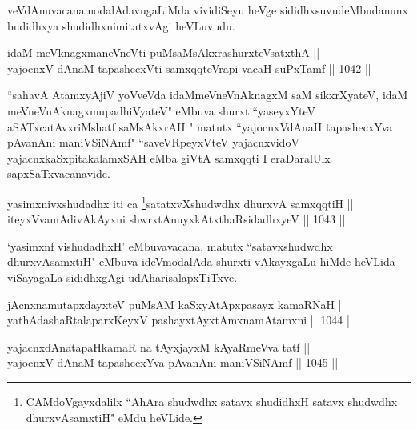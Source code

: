 \begin{artha}
veVdAnuvacanamodalAdavugaLiMda vividiSeyu heVge sididhxsuvudeMbudanunx budidhxya shudidhxnimitatxvAgi heVLuvudu.
\end{artha}


\begin{shl}
idaM meV\s knagxmaneVneVti puMsaMsAkxrashurxteVsatxthA || \\
yajocnxV dAnaM tapashecxVti samxqqteVrapi vacaH suPxTamf \hfill || 1042 || 
\end{shl}

\begin{artha}
``sahavA AtamxyAjiV yoVveVda idaMmeV\s neVnAknagxM saM sikxrXyateV, idaM meV\s neVnAknagxmupadhiVyateV" eMbuva shurxti\break ``yaseyxYteV aSATxcatAvxriMshatf saMsAkxrAH " matutx ``yajocnxVdAnaH tapashecxYva pAvanAni maniVSiNAmf" ``saveVRpeyxVteV yajacnxvidoV yajacnxkaSxpitakalamxSAH eMba giVtA samxqqti I eraDaralUlx sapxSaTxvacanavide.
\end{artha}



\begin{shl}
yasimxnivxshudadhx iti ca \footnote{CAMdoVgayxdalilx ``AhAra shudwdhx satavx shudidhxH satavx shudwdhx dhurxvAsamxtiH" eMdu heVLide.}satatxvXshudwdhx dhurxvA samxqqtiH || \\
iteyxVvamAdivAkAyxni shwrxtAnuyxkAtxthaRsidadhxyeV \hfill || 1043 ||  
\end{shl}

\begin{artha}
`yasimxnf vishudadhxH' eMbuvavacana, matutx ``satavxshudwdhx dhurxvAsamxtiH" eMbuva ideVmodalAda shurxti vAkayxgaLu hiMde heVLida viSayagaLa sididhxgAgi udAharisalapxTiTxve.
\end{artha}


\begin{shl}
jAcnxnamutapxdayxteV puMsAM kaSxyAtApxpasayx kamaRNaH || \\
yathA\s \s dashaRtalaparxKeyxV pashayxtAyxtAmxnamAtamxni \hfill || 1044 ||  
\end{shl}

\begin{shl}
yajacnxdAnatapaHkamaR na tAyxjayxM kAyaRmeVva tatf || \\
yajocnxV dAnaM tapashecxYva pAvanAni maniVSiNAmf \hfill || 1045 ||  
\end{shl}
				
